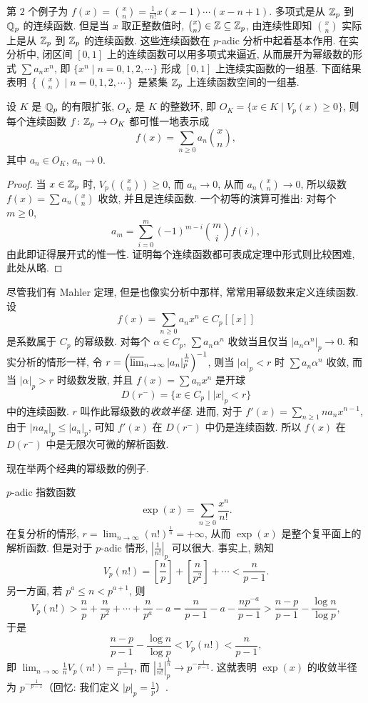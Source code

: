 第 $2$ 个例子为 $f(x)=\binom{x}{n}=\frac{1}{n!}x(x-1)\cdots(x-n+1)$. 多项式是从 $\mathbb{Z}_p$ 到 $\mathbb{Q}_p$ 的连续函数. 但是当 $x$ 取正整数值时, $\binom{x}{n}\in\mathbb{Z}\subseteq\mathbb{Z}_p$, 由连续性即知 $\binom{x}{n}$ 实际上是从 $\mathbb{Z}_p$ 到 $\mathbb{Z}_p$ 的连续函数. 这些连续函数在 $p$-adic 分析中起着基本作用. 在实分析中, 闭区间 $[0,1]$ 上的连续函数可以用多项式来逼近, 从而展开为幂级数的形式 $\sum a_nx^n$, 即 $\{x^n\mid n=0,1,2,\cdots\}$ 形成 $[0,1]$ 上连续实函数的一组基. 下面结果表明 $\left\{\binom{x}{n}\mid n=0,1,2,\cdots\right\}$ 是紧集 $\mathbb{Z}_p$ 上连续函数空间的一组基.

\begin{theoremnonum}
设 $K$ 是 $\mathbb{Q}_p$ 的有限扩张, $O_K$ 是 $K$ 的整数环, 即 $O_K=\{x\in K\mid V_p(x)\geqslant 0\}$, 则每个连续函数 $f\colon\mathbb{Z}_p\to O_K$ 都可惟一地表示成
\[
  f(x)=\sum_{n\geqslant 0}a_n\binom{x}{n},
\]
其中 $a_n\in O_K$, $a_n\to 0$.
\end{theoremnonum}

\begin{proof}
当 $x\in\mathbb{Z}_p$ 时, $V_p\left(\binom{x}{n}\right)\geqslant 0$, 而 $a_n\to 0$, 从而 $a_n\binom{x}{n}\to 0$, 所以级数 $f(x)=\sum a_n\binom{x}{n}$ 收敛, 并且是连续函数. 一个初等的演算可推出: 对每个 $m\geqslant 0$,
\[
  a_m=\sum_{i=0}^{m}(-1)^{m-i}\binom{m}{i}f(i),
\]
由此即证得展开式的惟一性. 证明每个连续函数都可表成定理中形式则比较困难, 此处从略.
\end{proof}

尽管我们有 Mahler 定理, 但是也像实分析中那样, 常常用幂级数来定义连续函数. 设
\[
  f(x)=\sum_{n\geqslant 0}a_nx^n\in C_p[[x]]
\]
是系数属于 $C_p$ 的幂级数. 对每个 $\alpha\in C_p$, $\sum a_n\alpha^n$ 收敛当且仅当 $|a_n\alpha^n|_p\to 0$. 和实分析的情形一样, 令 $r=\left(\varlimsup_{n\to\infty}|a_n|_p^{\frac{1}{n}}\right)^{-1}$, 则当 $|\alpha|_p<r$ 时 $\sum a_n\alpha^n$ 收敛, 而当 $|\alpha|_p>r$ 时级数发散, 并且 $f(x)=\sum a_nx^n$ 是开球
\[
  D(r^{-})=\{x\in C_p\mid|x|_p<r\}
\]
中的连续函数. $r$ 叫作此幂级数的\emph{收敛半径}. 进而, 对于 $f'(x)=\sum_{n\geqslant 1}na_nx^{n-1}$, 由于 $|na_n|_p\leqslant|a_n|_p$, 可知 $f'(x)$ 在 $D(r^{-})$ 中仍是连续函数. 所以 $f(x)$ 在 $D(r^{-})$ 中是无限次可微的解析函数.

现在举两个经典的幂级数的例子.

\begin{example}
$p$-adic 指数函数
\[
  \exp(x)=\sum_{n\geqslant 0}\frac{x^n}{n!}.
\]
在复分析的情形, $r=\lim_{n\to\infty}(n!)^{\frac{1}{n}}=+\infty$, 从而 $\exp(x)$ 是整个复平面上的解析函数. 但是对于 $p$-adic 情形, $\left|\frac{1}{n!}\right|_p$ 可以很大. 事实上, 熟知
\[
  V_p(n!)=\left[\frac{n}{p}\right]+\left[\frac{n}{p^2}\right]+\cdots<\frac{n}{p-1}.
\]
另一方面, 若 $p^a\leqslant n<p^{a+1}$, 则
\[
  V_p(n!)>\frac{n}{p}+\frac{n}{p^2}+\cdots+\frac{n}{p^a}-a
  =\frac{n}{p-1}-a-\frac{np^{-a}}{p-1}
  >\frac{n-p}{p-1}-\frac{\log n}{\log p},
\]
于是
\[
  \frac{n-p}{p-1}-\frac{\log n}{\log p}<V_p(n!)<\frac{n}{p-1},
\]
即 $\lim_{n\to\infty}\frac{1}{n}V_p(n!)=\frac{1}{p-1}$, 而 $\left|\frac{1}{n!}\right|_p^{\frac{1}{n}}\to p^{-\frac{1}{p-1}}$. 这就表明 $\exp(x)$ 的收敛半径为 $p^{-\frac{1}{p-1}}$（回忆: 我们定义 $|p|_p=\frac{1}{p}$）.
\end{example}

